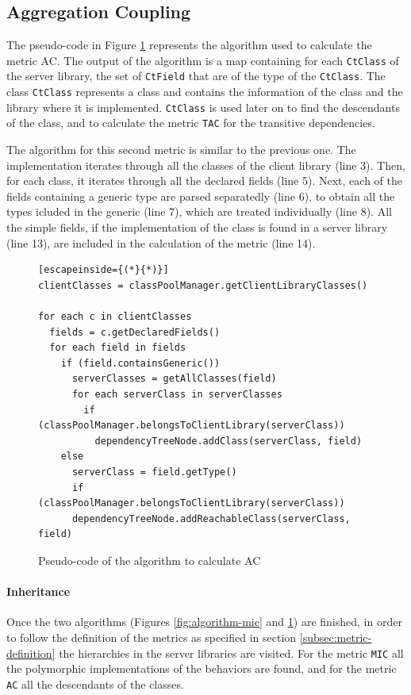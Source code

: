 \subsection{Aggregation Coupling}
The pseudo-code in Figure \ref{fig:algorithm-ac} represents the algorithm used to calculate the metric AC. The output of the algorithm is a map containing for each \texttt{CtClass} of the server library, the set of \texttt{CtField} that are of the type of the \texttt{CtClass}. The class \texttt{CtClass} represents a class and contains the information of the class and the library where it is implemented. \texttt{CtClass} is used later on to find the descendants of the class, and to calculate the metric \texttt{TAC} for the transitive dependencies.

The algorithm for this second metric is similar to the previous one. The implementation iterates through all the classes of the client library (line 3). Then, for each class, it iterates through all the declared fields (line 5). Next, each of the fields containing a generic type are parsed separatedly (line 6), to obtain all the types icluded in the generic  (line 7), which are treated individually (line 8). All the simple fields, if the implementation of the class is found in a server library (line 13), are included in the calculation of the metric (line 14).

\begin{figure}[ht!]
\begin{lstlisting}[escapeinside={(*}{*)}]
clientClasses = classPoolManager.getClientLibraryClasses()

for each c in clientClasses
  fields = c.getDeclaredFields()
  for each field in fields
    if (field.containsGeneric())
      serverClasses = getAllClasses(field)
      for each serverClass in serverClasses
        if (classPoolManager.belongsToClientLibrary(serverClass))
          dependencyTreeNode.addClass(serverClass, field)
    else
      serverClass = field.getType()
      if (classPoolManager.belongsToClientLibrary(serverClass))
      dependencyTreeNode.addReachableClass(serverClass, field)
\end{lstlisting}
\caption{Pseudo-code of the algorithm to calculate AC}
\label{fig:algorithm-ac}
\end{figure}

\paragraph{Inheritance}
Once the two algorithms (Figures \ref{fig:algorithm-mic} and \ref{fig:algorithm-ac}) are finished, in order to follow the definition of the metrics as specified in section \ref{subsec:metric-definition} the hierarchies in the server libraries are visited. For the metric \texttt{MIC} all the polymorphic implementations of the behaviors are found, and for the metric \texttt{AC} all the descendants of the classes.

